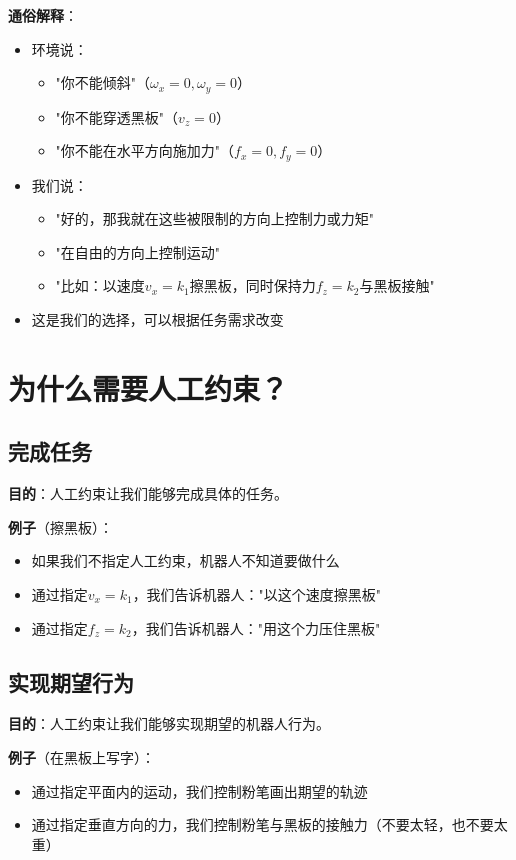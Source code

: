 \documentclass[12pt,a4paper]{article}
\begin{document}
\textbf{通俗解释}：
\begin{itemize}
\item 环境说：
\begin{itemize}
\item "你不能倾斜"（$\omega_x = 0, \omega_y = 0$）
\item "你不能穿透黑板"（$v_z = 0$）
\item "你不能在水平方向施加力"（$f_x = 0, f_y = 0$）
\end{itemize}
\item 我们说：
\begin{itemize}
\item "好的，那我就在这些被限制的方向上控制力或力矩"
\item "在自由的方向上控制运动"
\item "比如：以速度$v_x = k_1$擦黑板，同时保持力$f_z = k_2$与黑板接触"
\end{itemize}
\item 这是我们的选择，可以根据任务需求改变
\end{itemize}

\section{为什么需要人工约束？}

\subsection{完成任务}

\textbf{目的}：人工约束让我们能够完成具体的任务。

\textbf{例子}（擦黑板）：
\begin{itemize}
\item 如果我们不指定人工约束，机器人不知道要做什么
\item 通过指定$v_x = k_1$，我们告诉机器人："以这个速度擦黑板"
\item 通过指定$f_z = k_2$，我们告诉机器人："用这个力压住黑板"
\end{itemize}

\subsection{实现期望行为}

\textbf{目的}：人工约束让我们能够实现期望的机器人行为。

\textbf{例子}（在黑板上写字）：
\begin{itemize}
\item 通过指定平面内的运动，我们控制粉笔画出期望的轨迹
\item 通过指定垂直方向的力，我们控制粉笔与黑板的接触力（不要太轻，也不要太重）
\end{itemize}
\end{document}
